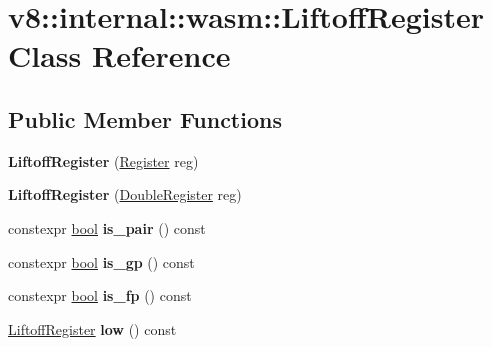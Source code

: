 \hypertarget{classv8_1_1internal_1_1wasm_1_1LiftoffRegister}{}\section{v8\+:\+:internal\+:\+:wasm\+:\+:Liftoff\+Register Class Reference}
\label{classv8_1_1internal_1_1wasm_1_1LiftoffRegister}
\subsection*{Public Member Functions}
\begin{DoxyCompactItemize}
\item 
\mbox{\label{classv8_1_1internal_1_1wasm_1_1LiftoffRegister_a479b4fdf6769fa13333c0514bdf9183e}} 
{\bfseries Liftoff\+Register} (\mbox{\hyperlink{classv8_1_1internal_1_1Register}{Register}} reg)
\item 
\mbox{\label{classv8_1_1internal_1_1wasm_1_1LiftoffRegister_a3289b94341cbe9ec850e2f857b32268e}} 
{\bfseries Liftoff\+Register} (\mbox{\hyperlink{classv8_1_1internal_1_1DoubleRegister}{Double\+Register}} reg)
\item 
\mbox{\label{classv8_1_1internal_1_1wasm_1_1LiftoffRegister_af80f0608ebb14866806c008e7eeee62e}} 
constexpr \mbox{\hyperlink{classbool}{bool}} {\bfseries is\+\_\+pair} () const
\item 
\mbox{\label{classv8_1_1internal_1_1wasm_1_1LiftoffRegister_a77135ea37005f440316679884cb2773d}} 
constexpr \mbox{\hyperlink{classbool}{bool}} {\bfseries is\+\_\+gp} () const
\item 
\mbox{\label{classv8_1_1internal_1_1wasm_1_1LiftoffRegister_a94f03ed16ce3dfd9dfaf40775e75c8f8}} 
constexpr \mbox{\hyperlink{classbool}{bool}} {\bfseries is\+\_\+fp} () const
\item 
\mbox{\label{classv8_1_1internal_1_1wasm_1_1LiftoffRegister_ad8285b7b784f1773fe520c4c3a050996}} 
\mbox{\hyperlink{classv8_1_1internal_1_1wasm_1_1LiftoffRegister}{Liftoff\+Register}} {\bfseries low} () const

\end{DoxyCompactItemize}
